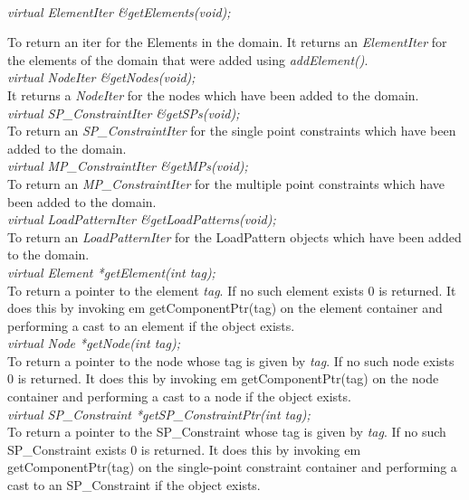   \\
{\em virtual ElementIter \&getElements(void);} 

To return an iter for the Elements in the domain. It returns an {\em
ElementIter} for the elements of the domain that were added using {\em
addElement()}. \\  

{\em virtual NodeIter \&getNodes(void);} \\
It returns a {\em NodeIter} for the nodes which have been added to the
domain. \\ 

{\em virtual SP\_ConstraintIter \&getSPs(void);} \\
To return an {\em SP\_ConstraintIter} for the single point constraints
which have been added to the domain. \\ 

{\em virtual MP\_ConstraintIter \&getMPs(void);} \\
To return an {\em MP\_ConstraintIter} for the multiple point
constraints which have been added to the domain. \\ 

{\em virtual LoadPatternIter \&getLoadPatterns(void);} \\
To return an {\em LoadPatternIter} for the LoadPattern
objects which have been added to the domain. \\ 

{\em virtual  Element *getElement(int tag);}\\
To return a pointer to the element {\em tag}. If no such element
exists $0$ is returned. It does this by invoking {em
getComponentPtr(tag)} on the element container and performing a cast
to an element if the object exists. \\

{\em virtual  Node *getNode(int tag);}\\
To return a pointer to the node whose tag is given by {\em tag}. If
no such node exists $0$ is returned. It does this by invoking {em
getComponentPtr(tag)} on the node container and performing a cast
to a node if the object exists. \\

{\em virtual  SP\_Constraint *getSP\_ConstraintPtr(int tag);}\\
To return a pointer to the SP\_Constraint whose tag is given by {\em tag}. If
no such SP\_Constraint exists $0$ is returned. It does this by invoking {em
getComponentPtr(tag)} on the single-point constraint container and
performing a cast to an SP\_Constraint if the object exists. \\


